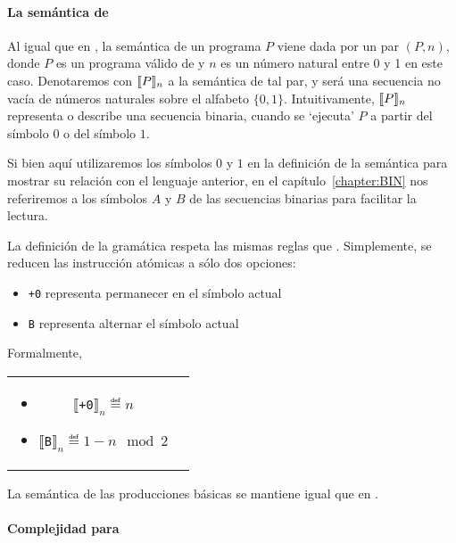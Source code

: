 \paragraph{La semántica de \grambin}

Al igual que en \grambin, la semántica de un programa $P$ viene dada por un par $(P,n)$, donde $P$ es un programa válido de \grambin y $n$ es un número natural entre 0 y 1 en este caso. Denotaremos con $\llbracket P\rrbracket_n$ a la semántica de tal par, y será una secuencia no vacía de números naturales sobre el alfabeto $\{0,1\}$. Intuitivamente, $\llbracket P\rrbracket_n$ representa o describe una secuencia binaria, cuando se `ejecuta' $P$ a partir del símbolo $0$ o del símbolo $1$. 

Si bien aquí utilizaremos los símbolos $0$ y $1$ en la definición de la semántica para mostrar su relación con el lenguaje anterior, en el capítulo~\ref{chapter:BIN} nos referiremos a los símbolos $A$ y $B$ de las secuencias binarias para facilitar la lectura.

La definición de la gramática \grambin respeta las mismas reglas que \gramgeo. Simplemente, se reducen las instrucción atómicas a sólo dos opciones: 
\begin{itemize}

\item \verb#+0# representa permanecer en el símbolo actual

\item \verb#B# representa alternar el símbolo actual 

\end{itemize}

Formalmente,

\begin{tabular}{cc}
    \begin{minipage}[t]{0.45\textwidth}
        \begin{itemize}
        \item $\llbracket$\verb#+0#$\rrbracket_n  \eqdef  n$ 
        \item $\llbracket$\verb#B#$ \rrbracket_n  \eqdef  1-n \mod 2$  
        \end{itemize}
    \end{minipage}
\end{tabular}

\medskip

La semántica de las producciones básicas se mantiene igual que en \gramgeo.

\paragraph{Complejidad para \grambin} 

